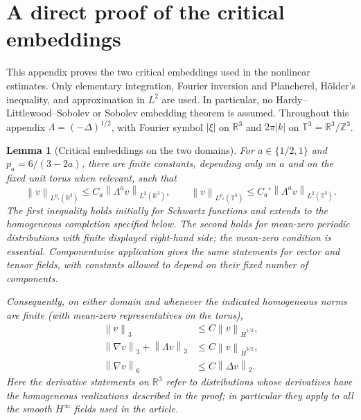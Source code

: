 \documentclass[11pt,a4paper]{article}
\newtheorem{lemma}[theorem]{Lemma}
\theoremstyle{definition}\newtheorem{definition}[theorem]{Definition}
\theoremstyle{remark}\newtheorem{remark}[theorem]{Remark}
\newcommand{\R}{\mathbb R}\newcommand{\TT}{\mathbb T^3}
\newcommand{\norm}[1]{\left\lVert#1\right\rVert}
\begin{document}
\appendix

\section{A direct proof of the critical embeddings}\label{sec:critical-appendix}
This appendix proves the two critical embeddings used in the nonlinear
estimates.  Only elementary integration, Fourier inversion and Plancherel,
H\"older's inequality, and approximation in $L^2$ are used.  In particular,
no Hardy--Littlewood--Sobolev or Sobolev embedding theorem is assumed.
Throughout this appendix $\Lambda=(-\Delta)^{1/2}$, with Fourier symbol
$|\xi|$ on $\R^3$ and $2\pi|k|$ on $\TT=\R^3/\mathbb Z^3$.

\begin{lemma}[Critical embeddings on the two domains]\label{lem:critical-embeddings}
For $a\in\{1/2,1\}$ and $p_a=6/(3-2a)$, there are finite constants,
depending only on $a$ and on the fixed unit torus when relevant, such that
\begin{equation}\label{eq:critical-embedding-pair}
 \norm{v}_{L^{p_a}(\R^3)}\le C_a\norm{\Lambda^a v}_{L^2(\R^3)},
 \qquad
 \norm{v}_{L^{p_a}(\TT)}\le C_a'\norm{\Lambda^a v}_{L^2(\TT)}.
\end{equation}
The first inequality holds initially for Schwartz functions and extends
to the homogeneous completion specified below.  The second holds for
mean-zero periodic distributions with finite displayed right-hand side;
the mean-zero condition is essential.  Componentwise application gives
the same statements for vector and tensor fields, with constants allowed
to depend on their fixed number of components.

Consequently, on either domain and whenever the indicated homogeneous
norms are finite (with mean-zero representatives on the torus),
\begin{align}
 \norm{v}_3&\le C\norm{v}_{\dot H^{1/2}},\nonumber\\
 \norm{\nabla v}_3+\norm{\Lambda v}_3
   &\le C\norm{v}_{\dot H^{3/2}},\label{eq:critical-derived}\\
 \norm{\nabla v}_6&\le C\norm{\Delta v}_2.\nonumber
\end{align}
Here the derivative statements on $\R^3$ refer to distributions whose
derivatives have the homogeneous realizations described in the proof;
in particular they apply to all the smooth $H^\infty$ fields used in
the article.
\end{lemma}
\end{document}
